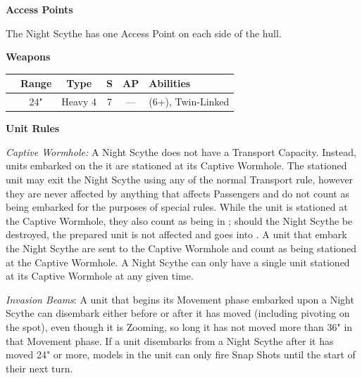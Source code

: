 \begin{minipage}[t]{0.72\textwidth}
	\vspace*{2em}
	\textbf{Access Points}
	
	The Night Scythe has one Access Point on each side of the hull.
	
	\vspace*{2em}
	\textbf{Weapons}
	
	\begin{tabular}{m{95 pt} *{4}{c} >{\raggedright\arraybackslash}p{130pt}}
		& Range & Type & S & AP & Abilities \\
		\hline
		\quickref{Tesla Destructor} & 24" & Heavy 4 & 7 & — & \quickref{Tesla} (6+), Twin-Linked
	\end{tabular}
	
	\vspace*{2em}
	\textbf{Unit Rules}
	
	\textit{Captive Wormhole:} A Night Scythe does not have a Transport Capacity. Instead, units embarked on the it are stationed at its Captive Wormhole. The stationed unit may exit the Night Scythe using any of the normal Transport rule, however they are never affected by anything that affects Passengers and do not count as being embarked for the purposes of special rules. While the unit is stationed at the Captive Wormhole, they also count as being in ; should the Night Scythe be destroyed, the prepared unit is not affected and goes into . A unit that embark the Night Scythe are sent to the Captive Wormhole and count as being stationed at the Captive Wormhole. A Night Scythe can only have a single unit stationed at its Captive Wormhole at any given time.
	
	\textit{Invasion Beams}: A unit that begins its Movement phase embarked upon a Night Scythe can disembark either before or after it has moved (including pivoting on the spot), even though it is Zooming, so long it has not moved more than 36" in that Movement phase. If a unit disembarks from a Night Scythe after it has moved 24" or more, models in the unit can only fire Snap Shots until the start of their next turn.
\end{minipage}


\newpage
\subsubsection[Tomb Blade Wing]{}

